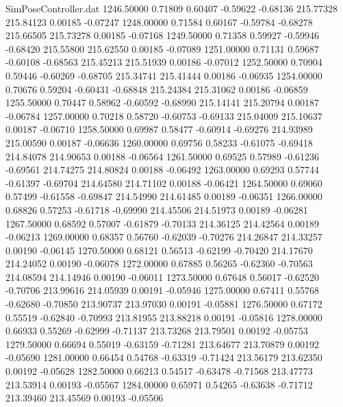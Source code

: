 \begin{filecontents}{SimPoseController.dat}
1246.50000    0.71809    0.60407    -0.59622   -0.68136  215.77328  215.84123    0.00185   -0.07247
1248.00000    0.71584    0.60167    -0.59784   -0.68278  215.66505  215.73278    0.00185   -0.07168
1249.50000    0.71358    0.59927    -0.59946   -0.68420  215.55800  215.62550    0.00185   -0.07089
1251.00000    0.71131    0.59687    -0.60108   -0.68563  215.45213  215.51939    0.00186   -0.07012
1252.50000    0.70904    0.59446    -0.60269   -0.68705  215.34741  215.41444    0.00186   -0.06935
1254.00000    0.70676    0.59204    -0.60431   -0.68848  215.24384  215.31062    0.00186   -0.06859
1255.50000    0.70447    0.58962    -0.60592   -0.68990  215.14141  215.20794    0.00187   -0.06784
1257.00000    0.70218    0.58720    -0.60753   -0.69133  215.04009  215.10637    0.00187   -0.06710
1258.50000    0.69987    0.58477    -0.60914   -0.69276  214.93989  215.00590    0.00187   -0.06636
1260.00000    0.69756    0.58233    -0.61075   -0.69418  214.84078  214.90653    0.00188   -0.06564
1261.50000    0.69525    0.57989    -0.61236   -0.69561  214.74275  214.80824    0.00188   -0.06492
1263.00000    0.69293    0.57744    -0.61397   -0.69704  214.64580  214.71102    0.00188   -0.06421
1264.50000    0.69060    0.57499    -0.61558   -0.69847  214.54990  214.61485    0.00189   -0.06351
1266.00000    0.68826    0.57253    -0.61718   -0.69990  214.45506  214.51973    0.00189   -0.06281
1267.50000    0.68592    0.57007    -0.61879   -0.70133  214.36125  214.42564    0.00189   -0.06213
1269.00000    0.68357    0.56760    -0.62039   -0.70276  214.26847  214.33257    0.00190   -0.06145
1270.50000    0.68121    0.56513    -0.62199   -0.70420  214.17670  214.24052    0.00190   -0.06078
1272.00000    0.67885    0.56265    -0.62360   -0.70563  214.08594  214.14946    0.00190   -0.06011
1273.50000    0.67648    0.56017    -0.62520   -0.70706  213.99616  214.05939    0.00191   -0.05946
1275.00000    0.67411    0.55768    -0.62680   -0.70850  213.90737  213.97030    0.00191   -0.05881
1276.50000    0.67172    0.55519    -0.62840   -0.70993  213.81955  213.88218    0.00191   -0.05816
1278.00000    0.66933    0.55269    -0.62999   -0.71137  213.73268  213.79501    0.00192   -0.05753
1279.50000    0.66694    0.55019    -0.63159   -0.71281  213.64677  213.70879    0.00192   -0.05690
1281.00000    0.66454    0.54768    -0.63319   -0.71424  213.56179  213.62350    0.00192   -0.05628
1282.50000    0.66213    0.54517    -0.63478   -0.71568  213.47773  213.53914    0.00193   -0.05567
1284.00000    0.65971    0.54265    -0.63638   -0.71712  213.39460  213.45569    0.00193   -0.05506

\end{filecontents}
